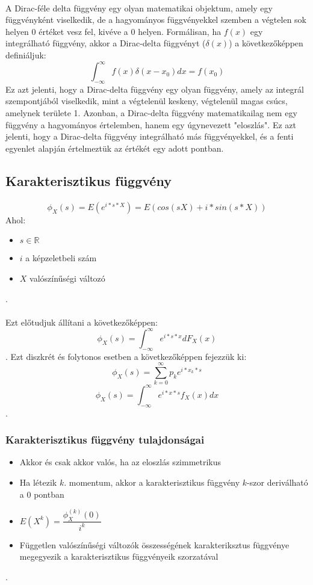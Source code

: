 \documentclass[11pt,a4paper]{article}
\begin{document}
				\paragraph{}
					A Dirac-féle delta függvény egy olyan matematikai objektum, amely egy függvényként viselkedik, de a hagyományos függvényekkel szemben a végtelen sok helyen 0 értéket vesz fel, kivéve a 0 helyen. Formálisan, ha $f(x)$ egy integrálható függvény, akkor a Dirac-delta függvényt ($\delta(x)$) a következőképpen definiáljuk:
					$$\int_{- \infty}^{\infty}f(x)\delta(x - x_0) dx = f(x_0)$$
					Ez azt jelenti, hogy a Dirac-delta függvény egy olyan függvény, amely az integrál szempontjából viselkedik, mint a végtelenül keskeny, végtelenül magas csúcs, amelynek területe 1. Azonban, a Dirac-delta függvény matematikailag nem egy függvény a hagyományos értelemben, hanem egy úgynevezett "eloszlás". Ez azt jelenti, hogy a Dirac-delta függvény integrálható más függvényekkel, és a fenti egyenlet alapján értelmeztük az értékét egy adott pontban.

			\subsection{Karakterisztikus függvény}
				\paragraph{}
					$$\phi_X(s) = E(e^{i*s*X}) = E(cos(sX) + i*sin(s*X))$$
					Ahol:
					\begin{itemize}
						\item $s \in \mathbb{R}$
						\item $i$ a képzeletbeli szám
						\item $X$ valószínűségi változó
					\end{itemize}.
				\paragraph{}
					Ezt előtudjuk állítani a következőképpen:
					$$\phi_X(s) = \int_{- \infty}^\infty e^{i*s*x} dF_X (x)$$.
					Ezt diszkrét és folytonos esetben a következőképpen fejezzük ki:
					$$\phi_X (s) = \sum_{k=0}^\infty p_k e^{i* x_k*s}$$
					$$\phi_X(s) = \int_{- \infty}^\infty e^{i*x*s} f_X(x)dx$$.
				\subsubsection{Karakterisztikus függvény tulajdonságai}
					\begin{itemize}
						\item Akkor és csak akkor valós, ha az eloszlás szimmetrikus
						\item Ha létezik $k$. momentum, akkor a karakterisztikus függvény $k$-szor deriválható a $0$ pontban
						\item $E(X^k) = \dfrac{\phi_X^{(k)} (0)}{i^k}$
						\item Független valószínűségi változók összességének karakteriksztus függvénye megegyezik a karakterisztikus függvényeik szorzatával
					\end{itemize}.
\end{document}
